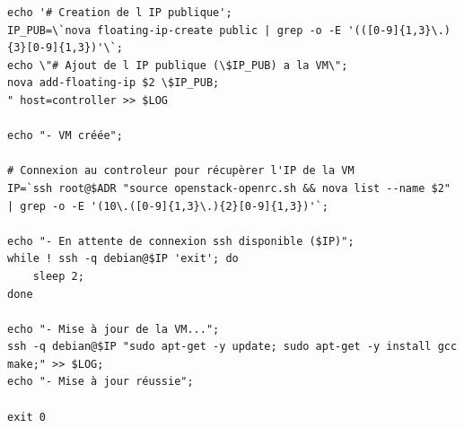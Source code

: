 \documentclass{report}
\begin{document}
\begin{verbatim}
echo '# Creation de l IP publique';
IP_PUB=\`nova floating-ip-create public | grep -o -E '(([0-9]{1,3}\.){3}[0-9]{1,3})'\`;
echo \"# Ajout de l IP publique (\$IP_PUB) a la VM\";
nova add-floating-ip $2 \$IP_PUB;
" host=controller >> $LOG

echo "- VM créée";

# Connexion au controleur pour récupèrer l'IP de la VM
IP=`ssh root@$ADR "source openstack-openrc.sh && nova list --name $2" | grep -o -E '(10\.([0-9]{1,3}\.){2}[0-9]{1,3})'`;

echo "- En attente de connexion ssh disponible ($IP)";
while ! ssh -q debian@$IP 'exit'; do
    sleep 2;
done

echo "- Mise à jour de la VM...";
ssh -q debian@$IP "sudo apt-get -y update; sudo apt-get -y install gcc make;" >> $LOG;
echo "- Mise à jour réussie";

exit 0
    \end{verbatim}
    
    
    
\end{document}
